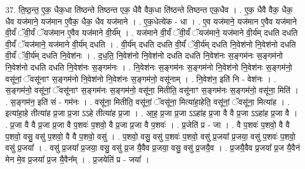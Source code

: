 \documentclass[17pt]{extarticle}
\begin{document}
37. ति॒ष्ठ॒न्त॒ ए॒क॒ धैक॒धा ति॑ष्ठन्ते तिष्ठन्त एक॒ धैवै वैक॒धा ति॑ष्ठन्ते तिष्ठन्त एक॒धैव । . ए॒क॒ धैवै वैक॒ धैक॒ धैव यज॑माने॒ यज॑मान ए॒वैक॒ धैक॒ धैव यज॑माने । . ए॒क॒धेत्ये॑क - धा । . ए॒व यज॑माने॒ यज॑मान ए॒वैव यज॑माने वी॒र्यं॑ ॅवी॒र्यं॑ ॅयज॑मान ए॒वैव यज॑माने वी॒र्य᳚म् । . यज॑माने वी॒र्यं॑ ॅवी॒र्यं॑ ॅयज॑माने॒ यज॑माने वी॒र्य॑म् दधति दधति वी॒र्यं॑ ॅयज॑माने॒ यज॑माने वी॒र्य॑म् दधति । . वी॒र्य॑म् दधति दधति वी॒र्यं॑ ॅवी॒र्य॑म् दधति नि॒वेश॑नो नि॒वेश॑नो दधति वी॒र्यं॑ ॅवी॒र्य॑म् दधति नि॒वेश॑नः । . द॒ध॒ति॒ नि॒वेश॑नो नि॒वेश॑नो दधति दधति नि॒वेश॑नः स॒ङ्गम॑नः स॒ङ्गम॑नो नि॒वेश॑नो दधति दधति नि॒वेश॑नः स॒ङ्गम॑नः । . नि॒वेश॑नः स॒ङ्गम॑नः स॒ङ्गम॑नो नि॒वेश॑नो नि॒वेश॑नः स॒ङ्गम॑नो॒ वसू॑नां॒ ॅवसू॑नाꣳ स॒ङ्गम॑नो नि॒वेश॑नो नि॒वेश॑नः स॒ङ्गम॑नो॒ वसू॑नाम् । . नि॒वेश॑न॒ इति॑ नि - वेश॑नः । . स॒ङ्गम॑नो॒ वसू॑नां॒ ॅवसू॑नाꣳ स॒ङ्गम॑नः स॒ङ्गम॑नो॒ वसू॑ना॒ मितीति॒ वसू॑नाꣳ स॒ङ्गम॑नः स॒ङ्गम॑नो॒ वसू॑ना॒ मिति॑ । . स॒ङ्गम॑न॒ इति॑ सं - गम॑नः । . वसू॑ना॒ मितीति॒ वसू॑नां॒ ॅवसू॑ना॒ मित्या॑हा॒हेति॒ वसू॑नां॒ ॅवसू॑ना॒ मित्या॑ह । . इत्या॑हा॒हे तीत्या॑ह प्र॒जा प्र॒जा ऽऽहे तीत्या॑ह प्र॒जा । . आ॒ह॒ प्र॒जा प्र॒जा ऽऽहा॑ह प्र॒जा वै वै प्र॒जा ऽऽहा॑ह प्र॒जा वै । . प्र॒जा वै वै प्र॒जा प्र॒जा वै प॒शवः॑ प॒शवो॒ वै प्र॒जा प्र॒जा वै प॒शवः॑ । . प्र॒जेति॑ प्र - जा । . वै प॒शवः॑ प॒शवो॒ वै वै प॒शवो॒ वसु॒ वसु॑ प॒शवो॒ वै वै प॒शवो॒ वसु॑ । . प॒शवो॒ वसु॒ वसु॑ प॒शवः॑ प॒शवो॒ वसु॑ प्र॒जया᳚ प्र॒जया॒ वसु॑ प॒शवः॑ प॒शवो॒ वसु॑ प्र॒जया᳚ । . वसु॑ प्र॒जया᳚ प्र॒जया॒ वसु॒ वसु॑ प्र॒ज यै॒वैव प्र॒जया॒ वसु॒ वसु॑ प्र॒जयै॒व । . प्र॒जयै॒वैव प्र॒जया᳚ प्र॒ज यै॒वैन॑ मेन मे॒व प्र॒जया᳚ प्र॒ज यै॒वैन᳚म् । . प्र॒जयेति॑ प्र - जया᳚ । \newline
\end{document}

